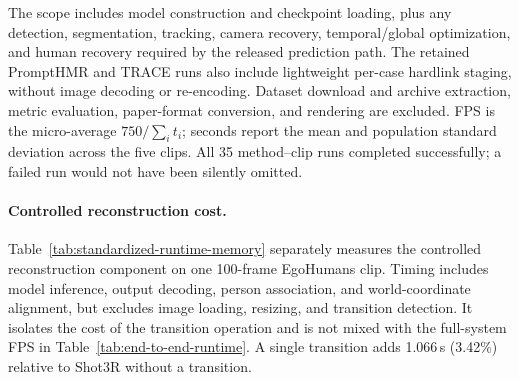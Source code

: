 The scope includes model construction and checkpoint loading, plus any
detection, segmentation, tracking, camera recovery, temporal/global
optimization, and human recovery required by the released prediction path.
The retained PromptHMR and TRACE runs also include lightweight per-case
hardlink staging, without image decoding or re-encoding. Dataset download and
archive extraction, metric evaluation, paper-format conversion, and rendering
are excluded. FPS is the micro-average $750/\sum_i t_i$; seconds report the
mean and population standard deviation across the five clips. All 35 method--clip
runs completed successfully; a failed run would not have been silently omitted.




\paragraph{Controlled reconstruction cost.}
Table~\ref{tab:standardized-runtime-memory} separately measures the controlled
reconstruction component on one 100-frame EgoHumans clip. Timing includes model
inference, output decoding, person association, and world-coordinate alignment,
but excludes image loading, resizing, and transition detection. It isolates the
cost of the transition operation and is not mixed with the full-system FPS in
Table~\ref{tab:end-to-end-runtime}. A single transition adds 1.066\,s (3.42\%)
relative to Shot3R without a transition.



